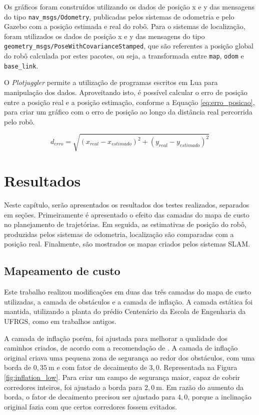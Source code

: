 \documentclass[repeatfields,xlists,xpacks,oneside,yearsonly]{ufrgscca}
\begin{document}
Os gráficos foram construídos utilizando os dados de posição x e y
das mensagens do tipo \texttt{nav\_msgs/Odometry}, publicadas pelos
sistemas de odometria e pelo Gazebo com a posição estimada e real do
robô. Para o sistemas de localização, foram utilizados os dados de
posição x e y das mensagens do tipo
\texttt{geometry\_msgs/PoseWithCovarianceStamped}, que são referentes
a posição global do robô calculada por estes pacotes, ou seja, a
transformada entre \texttt{map}, \texttt{odom} e \texttt{base\_link}.

O \textit{Plotjuggler} permite a utilização de programas escritos em
Lua para manipulação dos dados. Aproveitando isto, é possível
calcular o erro de posição entre a posição real e a posição
estimação, conforme a Equação \ref{eq:erro_posicao}, para criar um
gráfico com o erro de posição ao longo da distância real percorrida
pelo robô.

\begin{equation}
    \label{eq:erro_posicao}
    d_{erro} = \sqrt{(x_{real} - x_{estimado})^2 + (y_{real} - y_{estimado})^2}
\end{equation}

\chapter{Resultados}
\label{resultados}

Neste capítulo, serão apresentados os resultados dos testes
realizados, separados em seções. Primeiramente é apresentado o efeito
das camadas do mapa de custo no planejamento de trajetórias. Em
seguida, as estimativas de posição do robô, produzidas pelos sistemas
de odometria, localização são comparadas com a posição real.
Finalmente, são mostrados os mapas criados pelos sistemas SLAM.

\section{Mapeamento de custo}

Este trabalho realizou modificações em duas das três camadas do mapa
de custo utilizadas, a camada de obstáculos e a camada de inflação. A
camada estática foi mantida, utilizando a planta do prédio Centenário
da Escola de Engenharia da UFRGS, como em trabalhos antigos.

A camada de inflação porém, foi ajustada para melhorar a qualidade
dos caminhos criados, de acordo com a recomendação de
\textcite{ros_tuning_guide}. A camada de inflação original criava uma
pequena zona de segurança ao redor dos obstáculos, com uma borda de
$0,35~\si{\meter}$ e com fator de decaimento de $3,0$. Representada
na Figura \ref{fig:inflation_low}. Para criar um campo de segurança
maior, capaz de cobrir corredores inteiros, foi ajustado a borda para
$2,0~\si{\meter}$. Em razão do aumento da borda, o fator de
decaimento precisou ser ajustado para $4,0$, porque a inclinação
original fazia com que certos corredores fossem evitados.
\end{document}
